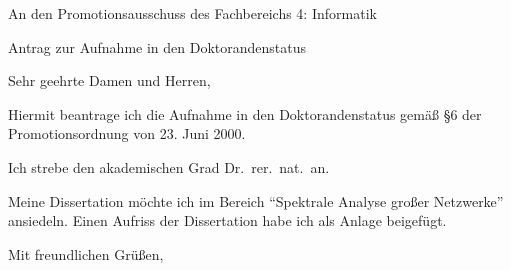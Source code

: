 \documentclass{letter}
\begin{document}
\begin{letter}{An den Promotionsausschuss des Fachbereichs 4: Informatik}

Antrag zur Aufnahme in den Doktorandenstatus

\opening{Sehr geehrte Damen und Herren,}
Hiermit beantrage ich die Aufnahme in den Doktorandenstatus
gemäß §6 der Promotionsordnung von 23. Juni 2000.

Ich strebe den akademischen Grad Dr.\ rer.\ nat.~an. 

Meine Dissertation möchte ich im Bereich "`Spektrale Analyse großer
Netzwerke"'
 ansiedeln. Einen Aufriss der Dissertation habe ich als Anlage
beigefügt.

\closing{Mit freundlichen Grüßen,}

\end{letter}
\end{document}
